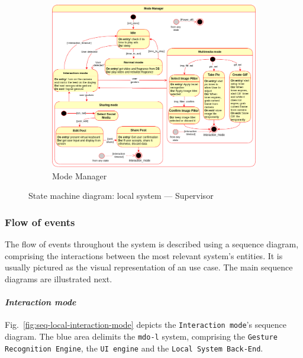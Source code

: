 \begin{figure}[htb!]
%
%
  \begin{subfigure}{.9\textwidth}
  \includegraphics[width=\textwidth]{img/state-mach-local-superv-mode.png}%
  \caption{Mode Manager}%
  \label{fig:state-mach-local-superv-mode}
\end{subfigure}
  \caption{State machine diagram: local system --- Supervisor}%
  \label{fig:state-mach-local-superv}
\end{figure}
%
%
\subsubsection{Flow of events}%
\label{sec:flow-events}
The flow of events throughout the system is described using a sequence diagram,
comprising the interactions between the most relevant system's entities. It is
usually pictured as the visual representation of an use case. The main sequence
diagrams are illustrated next.

\paragraph{\emph{Interaction mode}}
Fig.~\ref{fig:seq-local-interaction-mode} depicts the \texttt{Interaction
  mode}'s sequence diagram. The blue area delimits the \texttt{\gls{mdo-l}}
system, comprising the \texttt{Gesture Recognition Engine}, the \texttt{UI
  engine} and the \texttt{Local System Back-End}.


